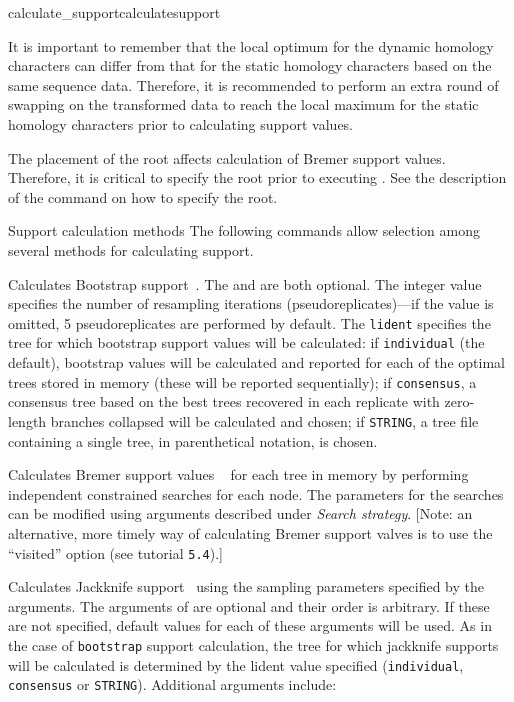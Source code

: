 \begin{command}{calculate\_support}{calculatesupport}
\begin{statement}
\setlength{\parindent}{0.5cm}                
\indent It is important to remember that the local optimum for the
dynamic homology characters can differ from that for the static
homology characters based on the same sequence data. Therefore, it
is recommended to perform an extra round of swapping on the transformed
data to reach the local maximum for the static homology characters
prior to calculating support values. 
\end{statement}

\begin{statement}
The placement of the root affects calculation of Bremer support values.
Therefore, it is critical to specify the root prior to executing
. See the description of the
command  on how to specify the root.
\end{statement}     

\begin{arguments}
\begin{argumentgroup}{Support calculation methods}
{The following commands allow selection among several methods for
calculating support.} 

{Calculates Bootstrap support~\cite{Felsenstein1985}.  The \poyint and 
\poylident are both optional.  The integer value specifies the number of 
resampling iterations (pseudoreplicates)---if the value is omitted, 5 
pseudoreplicates are performed by default.
The \texttt{lident} specifies the tree for which bootstrap support values
will be calculated: if \texttt{individual} (the default), bootstrap values 
will be calculated and reported for each of the optimal trees stored 
in memory (these will be reported sequentially); if \texttt{consensus}, 
a consensus tree based on the best trees recovered in each 
replicate with zero-length branches collapsed will be calculated
and chosen; if \texttt{STRING}, a tree file containing a 
single tree, in parenthetical notation, is chosen.}
{}

{Calculates Bremer support values ~\cite{Bremer1988, Kallersjoetal1992}
for each tree in memory by performing independent constrained
searches for each node. The parameters for the searches can be
modified using arguments described under \emph{Search strategy}.
[Note: an alternative, more timely way of calculating Bremer 
support valves is to use the ``visited'' option (see tutorial \texttt{5.4}).]}
{}

{Calculates Jackknife support~\cite{Farrisetal1996} using the 
sampling parameters specified by the arguments. The arguments of
 are optional and their order is arbitrary. If 
these are not specified, default values for each of these arguments 
will be used. As in the case of \texttt{bootstrap} support  calculation, 
the tree for which jackknife supports will be calculated is determined 
by the lident value specified (\texttt{individual}, \texttt{consensus} 
or \texttt{STRING}). Additional arguments include:}
{}


\end{argumentgroup}
\end{arguments}
\end{command}
